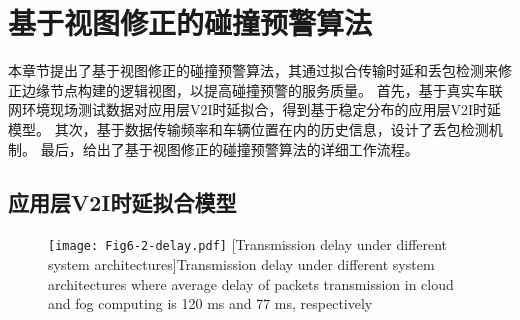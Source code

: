 \section{基于视图修正的碰撞预警算法}\label{section 5-3}

本章节提出了基于视图修正的碰撞预警算法，其通过拟合传输时延和丢包检测来修正边缘节点构建的逻辑视图，以提高碰撞预警的服务质量。
首先，基于真实车联网环境现场测试数据对应用层V2I时延拟合，得到基于稳定分布的应用层V2I时延模型。
其次，基于数据传输频率和车辆位置在内的历史信息，设计了丢包检测机制。
最后，给出了基于视图修正的碰撞预警算法的详细工作流程。

\subsection{应用层V2I时延拟合模型}

\begin{figure}[h]
\centering
  \texttt{[image: Fig6-2-delay.pdf]}
  [Transmission delay under different system architectures]{Transmission delay under different system architectures where average delay of packets transmission in cloud and fog computing is 120 ms and 77 ms, respectively}
  \label{fig 5-2}
\end{figure}

